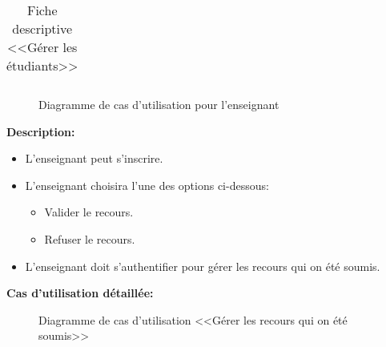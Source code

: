 \documentclass[12pt]{report}
\begin{document}
\begin{table}[h]
\begin{tabular}{|c|l|}
\end{tabular}
    \caption{Fiche descriptive <<Gérer les étudiants>>}
\end{table}

\newpage

\begin{figure}[h]
\centering
    \caption{Diagramme de cas d'utilisation pour l'enseignant}
\end{figure}

\vspace{0.7in}

\textbf{Description:}

\begin{itemize}
    \item L'enseignant peut s'inscrire.
    \item L'enseignant choisira l'une des options ci-dessous:
    \begin{itemize}
        \item Valider le recours.
        \item Refuser le recours.
    \end{itemize}
    \item L'enseignant doit s'authentifier pour gérer les recours qui on été soumis.
\end{itemize}

\newpage

\textbf{Cas d'utilisation détaillée:}

\vspace{0.3in}

\begin{figure}[h]
\centering
    \caption*{Diagramme de cas d'utilisation <<Gérer les recours qui on été soumis>>}
\end{figure}

\vspace{0.6in}
\end{document}
